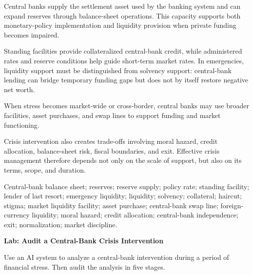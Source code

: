 Central banks supply the settlement asset used by the banking system and can expand reserves through balance-sheet operations. This capacity supports both monetary-policy implementation and liquidity provision when private funding becomes impaired.

Standing facilities provide collateralized central-bank credit, while administered rates and reserve conditions help guide short-term market rates. In emergencies, liquidity support must be distinguished from solvency support: central-bank lending can bridge temporary funding gaps but does not by itself restore negative net worth.

When stress becomes market-wide or cross-border, central banks may use broader facilities, asset purchases, and swap lines to support funding and market functioning.

Crisis intervention also creates trade-offs involving moral hazard, credit allocation, balance-sheet risk, fiscal boundaries, and exit. Effective crisis management therefore depends not only on the scale of support, but also on its terms, scope, and duration.





Central-bank balance sheet; reserves; reserve supply; policy rate;
standing facility; lender of last resort; emergency liquidity;
liquidity; solvency; collateral; haircut; stigma;
market liquidity facility; asset purchase; central-bank swap line;
foreign-currency liquidity; moral hazard; credit allocation;
central-bank independence; exit; normalization; market discipline.





\textbf{Lab: Audit a Central-Bank Crisis Intervention}

Use an AI system to analyze a central-bank intervention during a period of financial stress. Then audit the analysis in five stages.


